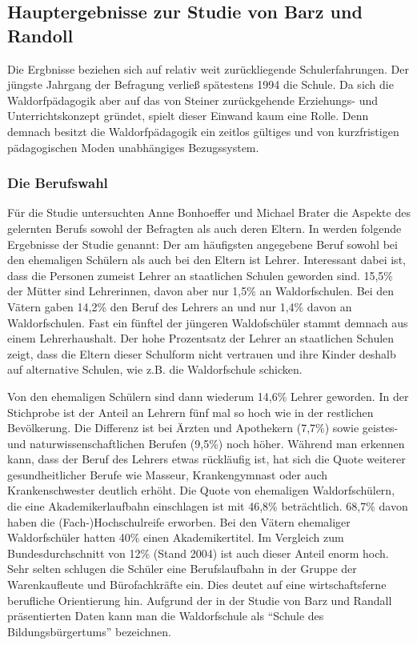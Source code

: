 \subsection{Hauptergebnisse zur Studie von Barz und Randoll} %
\label{sub:hauptergebnisse}


Die Ergbnisse beziehen sich auf relativ weit zurückliegende Schulerfahrungen. 
Der jüngste Jahrgang der Befragung verließ spätestens 1994 die Schule. 
Da sich die Waldorfpädagogik aber auf das von Steiner zurückgehende Erziehungs- und Unterrichtskonzept gründet, spielt dieser Einwand kaum eine Rolle. 
Denn demnach besitzt die Waldorfpädagogik ein zeitlos gültiges und von kurzfristigen pädagogischen Moden unabhängiges Bezugssystem. \citep[Vgl.][S. 16]{randoll07}

\subsubsection{Die Berufswahl}
\label{subsub:Berufswahl}

Für die Studie untersuchten Anne Bonhoeffer und Michael Brater die Aspekte des gelernten Berufs sowohl der Befragten als auch deren Eltern. 
In \citet[][S. 16f]{randoll07} werden folgende Ergebnisse der Studie genannt: Der am häufigsten angegebene Beruf sowohl bei den ehemaligen Schülern als auch bei den Eltern ist Lehrer. 
Interessant dabei ist, dass die Personen zumeist Lehrer an staatlichen Schulen geworden sind. 
15,5\% der Mütter sind Lehrerinnen, davon aber nur 1,5\% an Waldorfschulen. 
Bei den Vätern gaben 14,2\% den Beruf des Lehrers an und nur 1,4\% davon an Waldorfschulen. 
Fast ein fünftel der jüngeren Waldofschüler stammt demnach aus einem Lehrerhaushalt. 
Der hohe Prozentsatz der Lehrer an staatlichen Schulen zeigt, dass die Eltern dieser Schulform nicht vertrauen und ihre Kinder deshalb auf alternative Schulen, wie z.B. die Waldorfschule schicken.

Von den ehemaligen Schülern sind dann wiederum 14,6\% Lehrer geworden. 
In der Stichprobe ist der Anteil an Lehrern fünf mal so hoch wie in der restlichen Bevölkerung. 
Die Differenz ist bei Ärzten und Apothekern (7,7\%) sowie geistes- und naturwissenschaftlichen Berufen (9,5\%) noch höher. 
Während man erkennen kann, dass der Beruf des Lehrers etwas rückläufig ist, hat sich die Quote weiterer gesundheitlicher Berufe wie Masseur, Krankengymnast oder auch Krankenschwester deutlich erhöht. 
Die Quote von ehemaligen Waldorfschülern, die eine Akademikerlaufbahn einschlagen ist mit 46,8\% beträchtlich. 
68,7\% davon haben die (Fach-)Hochschulreife erworben. Bei den Vätern ehemaliger Waldorfschüler hatten 40\% einen Akademikertitel. 
Im Vergleich zum Bundesdurchschnitt von 12\% (Stand 2004) ist auch dieser Anteil enorm hoch. 
Sehr selten schlugen die Schüler eine Berufslaufbahn in der Gruppe der Warenkaufleute und Bürofachkräfte ein. 
Dies deutet auf eine wirtschaftsferne berufliche Orientierung hin. 
Aufgrund der in der Studie von Barz und Randall präsentierten Daten kann man die Waldorfschule als \enquote{Schule des Bildungsbürgertums} bezeichnen. \citep[][S. 17]{randoll07} 

